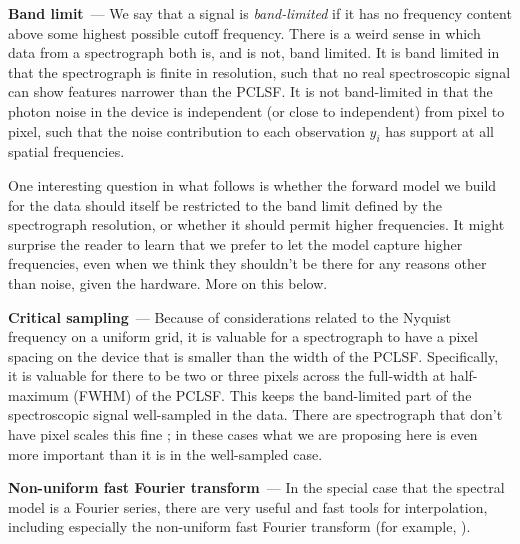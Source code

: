 \documentclass[11pt]{article}
\renewcommand{\paragraph}[1]{\medskip\par\noindent\textbf{#1}~---}
\begin{document}
\paragraph{Band limit}
We say that a signal is \emph{band-limited} if it has no frequency content above some highest possible cutoff frequency.
There is a weird sense in which data from a spectrograph both is, and is not, band limited.
It is band limited in that the spectrograph is finite in resolution, such that no real spectroscopic signal can show features narrower than the PCLSF.
It is not band-limited in that the photon noise in the device is independent (or close to independent) from pixel to pixel, such that the noise contribution to each observation $y_i$ has support at all spatial frequencies.

One interesting question in what follows is whether the forward model we build for the data should itself be restricted to the band limit defined by the spectrograph resolution, or whether it should permit higher frequencies.
It might surprise the reader to learn that we prefer to let the model capture higher frequencies, even when we think they shouldn't be there for any reasons other than noise, given the hardware.
More on this below.

\paragraph{Critical sampling}
Because of considerations related to the Nyquist frequency on a uniform grid, it is valuable for a spectrograph to have a pixel spacing on the device that is smaller than the width of the PCLSF.
Specifically, it is valuable for there to be two or three pixels across the full-width at half-maximum (FWHM) of the PCLSF.
This keeps the band-limited part of the spectroscopic signal well-sampled in the data.
There are spectrograph that don't have pixel scales this fine \cite{apogeehardware}; in these cases what we are proposing here is even more important than it is in the well-sampled case.

\paragraph{Non-uniform fast Fourier transform}
In the special case that the spectral model is a Fourier series, there are very useful and fast tools for interpolation, including especially the non-uniform fast Fourier transform (for example, \cite{finufft}).
\end{document}
